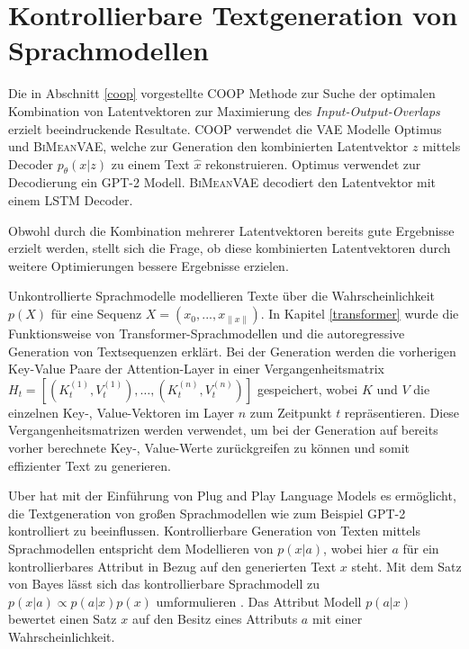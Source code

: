 \section{Kontrollierbare Textgeneration von Sprachmodellen}\raggedbottom
Die in Abschnitt \ref{coop} vorgestellte COOP Methode zur Suche der optimalen Kombination von Latentvektoren zur Maximierung des \textit{Input-Output-Overlaps} erzielt beeindruckende Resultate.
COOP verwendet die VAE Modelle Optimus und \textsc{BiMeanVAE}, welche zur Generation den kombinierten Latentvektor $z$ mittels Decoder $p_\theta(x|z)$ zu einem Text $\hat{x}$ rekonstruieren.
Optimus verwendet zur Decodierung ein GPT-2 Modell. \textsc{BiMeanVAE} decodiert den Latentvektor mit einem LSTM Decoder.

Obwohl durch die Kombination mehrerer Latentvektoren bereits gute Ergebnisse erzielt werden, stellt sich die Frage, ob diese kombinierten Latentvektoren durch weitere Optimierungen bessere Ergebnisse erzielen.

Unkontrollierte Sprachmodelle modellieren Texte über die Wahrscheinlichkeit $p(X)$ für eine Sequenz $X=(x_0,...,x_{\| x \|})$.
In Kapitel \ref{transformer} wurde die Funktionsweise von Transformer-Sprachmodellen und die autoregressive Generation von Textsequenzen erklärt. 
Bei der Generation werden die vorherigen Key-Value Paare der Attention-Layer in einer Vergangenheitsmatrix $H_t = [(K_t^{(1)},V_t^{(1)}), \ldots , (K_t^{(n)},V_t^{(n)})]$ gespeichert, wobei $K$ und $V$ die einzelnen Key-, Value-Vektoren im Layer $n$ zum Zeitpunkt $t$ repräsentieren. %
Diese Vergangenheitsmatrizen werden verwendet, um bei der Generation auf bereits vorher berechnete Key-, Value-Werte zurückgreifen zu können und somit effizienter Text zu generieren.


Uber hat mit der Einführung von Plug and Play Language Models \citep{DBLP:journals/corr/abs-1912-02164} es ermöglicht, die Textgeneration von großen Sprachmodellen wie zum Beispiel GPT-2 kontrolliert zu beeinflussen.
Kontrollierbare Generation von Texten mittels Sprachmodellen entspricht dem Modellieren von $p(x|a)$, wobei hier $a$ für ein kontrollierbares Attribut in Bezug auf den generierten Text $x$ steht. 
Mit dem Satz von Bayes lässt sich das kontrollierbare Sprachmodell zu $p(x|a)\propto p(a|x)p(x)$ umformulieren \citep{DBLP:journals/corr/abs-1912-02164}. 
Das Attribut Modell $p(a|x)$ bewertet einen Satz $x$ auf den Besitz eines Attributs $a$ mit einer Wahrscheinlichkeit.


